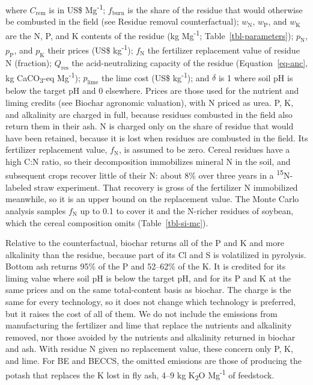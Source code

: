 \documentclass[
  letterpaper,
  twoside,
  twocolumn,
  9pt]{article}
\begin{document}
where \(C_{\mathrm{rem}}\) is in US\$ Mg\textsuperscript{-1};
\(f_{\mathrm{burn}}\) is the share of the residue that would otherwise
be combusted in the field (see Residue removal counterfactual);
\(w_{\mathrm{N}}\), \(w_{\mathrm{P}}\), and \(w_{\mathrm{K}}\) are the
N, P, and K contents of the residue (kg Mg\textsuperscript{-1};
Table~\ref{tbl-parameters}); \(p_{\mathrm{N}}\), \(p_{\mathrm{P}}\), and
\(p_{\mathrm{K}}\) their prices (US\$ kg\textsuperscript{-1});
\(f_{\mathrm{N}}\) the fertilizer replacement value of residue N
(fraction); \(Q_{\mathrm{res}}\) the acid-neutralizing capacity of the
residue (Equation~\ref{eq-anc}, kg CaCO\textsubscript{3}-eq
Mg\textsuperscript{-1}); \(p_{\mathrm{lime}}\) the lime cost (US\$
kg\textsuperscript{-1}); and \(\delta\) is 1 where soil pH is below the
target pH and 0 elsewhere. Prices are those used for the nutrient and
liming credits (see Biochar agronomic valuation), with N priced as urea.
P, K, and alkalinity are charged in full, because residues combusted in
the field also return them in their ash. N is charged only on the share
of residue that would have been retained, because it is lost when
residues are combusted in the field. Its fertilizer replacement value,
\(f_{\mathrm{N}}\), is assumed to be zero. Cereal residues have a high
C:N ratio, so their decomposition immobilizes mineral N in the soil, and
subsequent crops recover little of their N: about 8\% over three years
in a \textsuperscript{15}N-labeled straw experiment.\citep{thomsen1994}
That recovery is gross of the fertilizer N immobilized meanwhile, so it
is an upper bound on the replacement value. The Monte Carlo analysis
samples \(f_{\mathrm{N}}\) up to 0.1 to cover it and the N-richer
residues of soybean, which the cereal composition omits
(Table~\ref{tbl-si-mc}).

Relative to the counterfactual, biochar returns all of the P and K and
more alkalinity than the residue, because part of its Cl and S is
volatilized in pyrolysis. Bottom ash returns 95\% of the P and 52--62\%
of the K. It is credited for its liming value where soil pH is below the
target pH, and for its P and K at the same prices and on the same
total-content basis as biochar. The charge is the same for every
technology, so it does not change which technology is preferred, but it
raises the cost of all of them. We do not include the emissions from
manufacturing the fertilizer and lime that replace the nutrients and
alkalinity removed, nor those avoided by the nutrients and alkalinity
returned in biochar and ash. With residue N given no replacement value,
these concern only P, K, and lime. For BE and BECCS, the omitted
emissions are those of producing the potash that replaces the K lost in
fly ash, 4--9 kg K\textsubscript{2}O Mg\textsuperscript{-1} of
feedstock.
\end{document}
